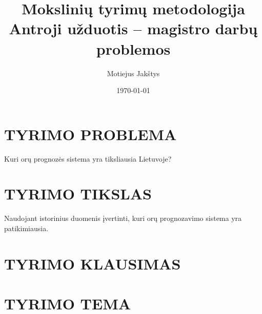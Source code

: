\documentclass{article}
\title{Mokslinių tyrimų metodologija\\ \vspace{4mm} 
Antroji užduotis -- magistro darbų problemos}
\author{Motiejus Jakštys}
\date{\today}
\begin{document}
\maketitle

\section{TYRIMO PROBLEMA}

Kuri orų prognozės sistema yra tiksliausia Lietuvoje?

\section{TYRIMO TIKSLAS}

Naudojant istorinius duomenis įvertinti, kuri orų prognozavimo sistema yra
patikimiausia.

\section{TYRIMO KLAUSIMAS}

\section{TYRIMO TEMA}
\end{document}
